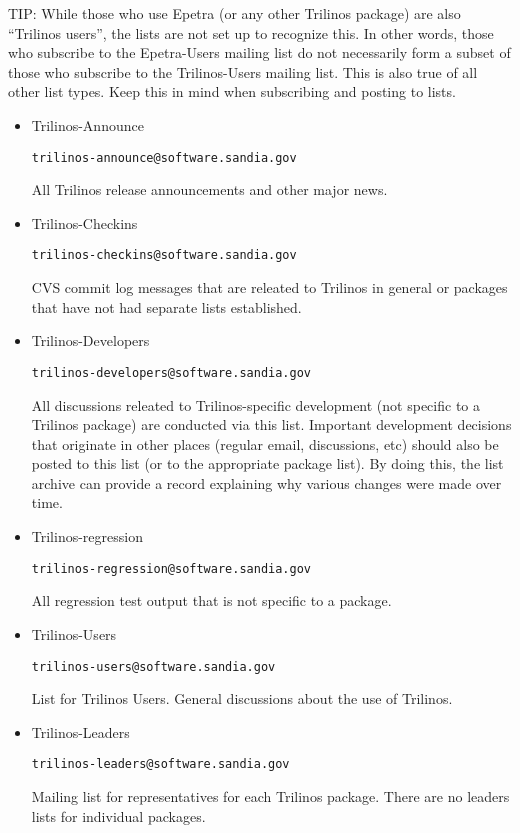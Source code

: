 \documentclass[12pt,relax]{SANDreport}
\begin{document}
TIP: While those who use Epetra (or any other Trilinos package) are also
``Trilinos users'', the lists are not set up to recognize this.  In other 
words, those who subscribe to the Epetra-Users mailing list do not necessarily 
form a subset of those who subscribe to the Trilinos-Users mailing list.  This 
is also true of all other list types.  Keep this in mind when subscribing and 
posting to lists.
\begin{itemize}
\item Trilinos-Announce 
\begin{verbatim}trilinos-announce@software.sandia.gov\end{verbatim}

All Trilinos release announcements and other major news.

\item Trilinos-Checkins 
\begin{verbatim}trilinos-checkins@software.sandia.gov\end{verbatim}

CVS commit log messages that are releated to Trilinos in general or packages 
that have not had separate lists established.

\item Trilinos-Developers 
\begin{verbatim}trilinos-developers@software.sandia.gov\end{verbatim}

All discussions releated to Trilinos-specific development (not specific to a 
Trilinos package) are conducted via this list.  Important development 
decisions that originate in other places (regular email, discussions, etc) 
should also be posted to this list (or to the appropriate package list).  
By doing this, the list archive can provide a record explaining why various 
changes were made over time.

\item Trilinos-regression 
\begin{verbatim}trilinos-regression@software.sandia.gov\end{verbatim}

All regression test output that is not specific to a package. 

\item Trilinos-Users 
\begin{verbatim}trilinos-users@software.sandia.gov\end{verbatim}

List for Trilinos Users.  General discussions about the use of Trilinos.

\item Trilinos-Leaders
\begin{verbatim}trilinos-leaders@software.sandia.gov\end{verbatim}

Mailing list for representatives for each Trilinos package.  There are no 
leaders lists for individual packages.
\end{itemize}
\end{document}
